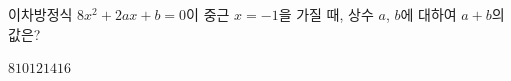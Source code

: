 이차방정식 $8x^2+2ax+b=0$이 중근 $x=-1$을 가질 때, 상수 $a$, $b$에 대하여 $a+b$의 값은?
\begin{choices32}{$8$}{$10$}{$12$}{$14$}{$16$}\end{choices32}
